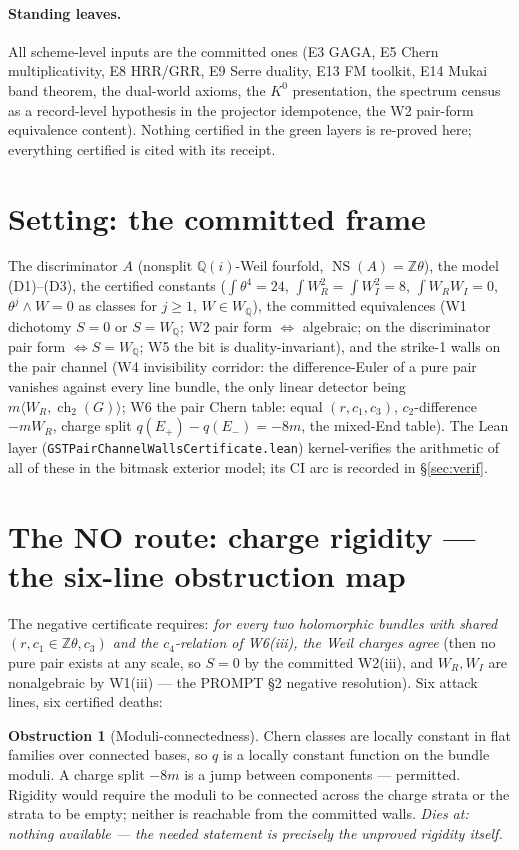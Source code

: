 \documentclass[11pt]{article}
\theoremstyle{definition}
\newtheorem{obstruction}[theorem]{Obstruction}
\newcommand{\ch}{\operatorname{ch}}
\newcommand{\NS}{\operatorname{NS}}
\newcommand{\Q}{\mathbb{Q}}
\newcommand{\Z}{\mathbb{Z}}
\newcommand{\WQ}{W_{\Q}}
\begin{document}
\paragraph{Standing leaves.} All scheme-level inputs are the committed ones
(E3 GAGA, E5 Chern multiplicativity, E8 HRR/GRR, E9 Serre duality, E13 FM
toolkit, E14 Mukai band theorem, the dual-world axioms, the $K^0$ presentation,
the spectrum census as a record-level hypothesis in the projector idempotence,
the W2 pair-form equivalence content). Nothing certified in the green layers is
re-proved here; everything certified is cited with its receipt.

\section{Setting: the committed frame}\label{sec:setting}

The discriminator $A$ (nonsplit $\Q(i)$-Weil fourfold, $\NS(A)=\Z\theta$),
the model (D1)--(D3), the certified constants
($\int\theta^4=24$, $\int W_R^2=\int W_I^2=8$, $\int W_RW_I=0$,
$\theta^j\wedge W=0$ as classes for $j\ge 1$, $W\in\WQ$), the committed
equivalences (W1 dichotomy $S=0$ or $S=W_\Q$; W2 pair form $\iff$ algebraic;
on the discriminator pair form $\iff S=W_\Q$; W5 the bit is duality-invariant),
and the strike-1 walls on the pair channel (W4 invisibility corridor: the
difference-Euler of a pure pair vanishes against every line bundle, the only
linear detector being $m\langle W_R,\ch_2(G)\rangle$; W6 the pair Chern table:
equal $(r,c_1,c_3)$, $c_2$-difference $-mW_R$, charge split
$q(E_+)-q(E_-)=-8m$, the mixed-End table). The Lean layer
(\texttt{GSTPairChannelWallsCertificate.lean}) kernel-verifies the arithmetic
of all of these in the bitmask exterior model; its CI arc is recorded in
\S\ref{sec:verif}.

\section{The NO route: charge rigidity --- the six-line obstruction map}\label{sec:no}

The negative certificate requires: \emph{for every two holomorphic bundles with
shared $(r,c_1\in\Z\theta,c_3)$ and the $c_4$-relation of W6(iii), the Weil
charges agree} (then no pure pair exists at any scale, so $S=0$ by the
committed W2(iii), and $W_R,W_I$ are nonalgebraic by W1(iii) --- the PROMPT
\S2 negative resolution). Six attack lines, six certified deaths:

\begin{obstruction}[Moduli-connectedness]
Chern classes are locally constant in flat families over connected bases, so
$q$ is a locally constant function on the bundle moduli. A charge split $-8m$
is a jump between components --- permitted. Rigidity would require the moduli
to be connected across the charge strata or the strata to be empty; neither is
reachable from the committed walls. \emph{Dies at: nothing available --- the
needed statement is precisely the unproved rigidity itself.}
\end{obstruction}
\end{document}
